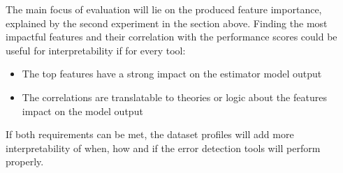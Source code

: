 The main focus of evaluation will lie on the produced feature importance, explained by the second experiment in the section above. Finding the most impactful features and their correlation with the performance scores could be useful for interpretability if for every tool:
\begin{itemize}
    \item The top features have a strong impact on the estimator model output
    \item The correlations are translatable to theories or logic about the features impact on the model output
\end{itemize}

If both requirements can be met, the dataset profiles will add more interpretability of when, how and if the error detection tools will perform properly.